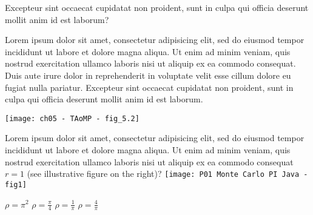 \question 
{}
Excepteur sint occaecat cupidatat non proident, sunt in culpa qui officia deserunt mollit anim id est laborum?
\begin{splitquestion}{0.5}
\begin{choices}
\choice Lorem ipsum dolor sit amet, consectetur adipisicing elit, sed do eiusmod tempor incididunt ut labore et dolore magna aliqua.
\CHOICE Ut enim ad minim veniam, quis nostrud exercitation ullamco laboris nisi ut aliquip ex ea commodo consequat.
\choice Duis aute irure dolor in reprehenderit in voluptate velit esse cillum dolore eu fugiat nulla pariatur.
\choice Excepteur sint occaecat cupidatat non proident, sunt in culpa qui officia deserunt mollit anim id est laborum.
\end{choices}
\nextpart
\texttt{[image: ch05 - TAoMP - fig\_5.2]}
\end{splitquestion}



\question
\begin{splitquestion}{0.1}
Lorem ipsum dolor sit amet, consectetur adipisicing elit, sed do eiusmod tempor incididunt ut labore et dolore magna aliqua. Ut enim ad minim veniam, quis nostrud exercitation ullamco laboris nisi ut aliquip ex ea commodo consequat \(r = 1\) (see illustrative figure on the right)?
\nextpart
\texttt{[image: P01 Monte Carlo PI Java - fig1]}
\end{splitquestion}
\begin{choices}[4]
\CHOICE \(\rho = \pi^2\)
\CHOICE \(\rho = \frac{\pi}{4}\)
\CHOICE \(\rho = \frac{1}{\pi}\)
\CHOICE \(\rho = \frac{4}{\pi}\)
\end{choices}


